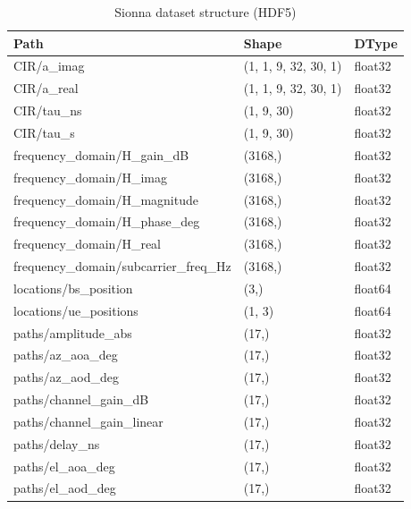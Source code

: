 \begin{table}
\caption{Sionna dataset structure (HDF5)}
\label{tab:sionna_dataset}
\begin{tabular}{lll}
\toprule
Path & Shape & DType \\
\midrule
CIR/a\_imag & (1, 1, 9, 32, 30, 1) & float32 \\
CIR/a\_real & (1, 1, 9, 32, 30, 1) & float32 \\
CIR/tau\_ns & (1, 9, 30) & float32 \\
CIR/tau\_s & (1, 9, 30) & float32 \\
frequency\_domain/H\_gain\_dB & (3168,) & float32 \\
frequency\_domain/H\_imag & (3168,) & float32 \\
frequency\_domain/H\_magnitude & (3168,) & float32 \\
frequency\_domain/H\_phase\_deg & (3168,) & float32 \\
frequency\_domain/H\_real & (3168,) & float32 \\
frequency\_domain/subcarrier\_freq\_Hz & (3168,) & float32 \\
locations/bs\_position & (3,) & float64 \\
locations/ue\_positions & (1, 3) & float64 \\
paths/amplitude\_abs & (17,) & float32 \\
paths/az\_aoa\_deg & (17,) & float32 \\
paths/az\_aod\_deg & (17,) & float32 \\
paths/channel\_gain\_dB & (17,) & float32 \\
paths/channel\_gain\_linear & (17,) & float32 \\
paths/delay\_ns & (17,) & float32 \\
paths/el\_aoa\_deg & (17,) & float32 \\
paths/el\_aod\_deg & (17,) & float32 \\
\bottomrule
\end{tabular}
\end{table}
